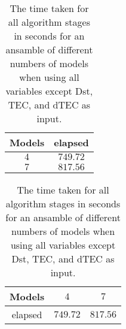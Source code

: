 \begin{table}[!ht]
	\centering
	\begin{tabular}{|c|c|}
		\hline
		Models & elapsed \\ \hline
		$4$ & $749.72$ \\ \hline
		$7$ & $817.56$ \\ \hline
	\end{tabular}
	\caption{The time taken for all algorithm stages in seconds for an ansamble of different numbers of models when using all variables except Dst, TEC, and dTEC as input.}
	\label{tab:time:ansamble:noTEC}
\end{table}

\begin{table}[!ht]
	\centering
	\begin{tabular}{|c|c|c|}
		\hline
		Models & $4$ & $7$ \\ \hline
		elapsed & $749.72$ & $817.56$ \\ \hline
	\end{tabular}
	\caption{The time taken for all algorithm stages in seconds for an ansamble of different numbers of models when using all variables except Dst, TEC, and dTEC as input.}
	\label{tab:time:ansamble:reverse:noTEC}
\end{table}
